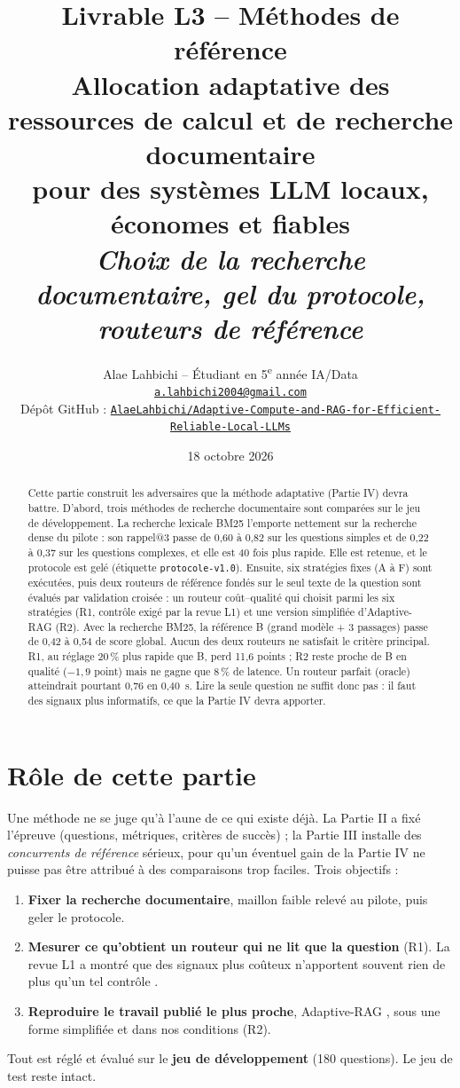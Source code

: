 \documentclass[11pt,a4paper]{article}
\title{\textbf{Livrable L3 -- Méthodes de référence}\\[4pt]
\large Allocation adaptative des ressources de calcul et de recherche documentaire\\ pour des systèmes LLM locaux, économes et fiables\\[2pt]
\normalsize\textit{Choix de la recherche documentaire, gel du protocole, routeurs de référence}}
\author{Alae Lahbichi -- Étudiant en 5\textsuperscript{e} année IA/Data\\[2pt]
\small\href{mailto:a.lahbichi2004@gmail.com}{\texttt{a.lahbichi2004@gmail.com}}\\
\small Dépôt GitHub : \href{https://github.com/AlaeLahbichi/Adaptive-Compute-and-RAG-for-Efficient-Reliable-Local-LLMs}{\footnotesize\texttt{AlaeLahbichi/Adaptive-Compute-and-RAG-for-Efficient-Reliable-Local-LLMs}}}
\date{18 octobre 2026}
\begin{document}
\maketitle

\begin{abstract}
\noindent Cette partie construit les adversaires que la méthode adaptative (Partie IV) devra battre.
D'abord, trois méthodes de recherche documentaire sont comparées sur le jeu de développement. La
recherche lexicale BM25 l'emporte nettement sur la recherche dense du pilote : son rappel@3 passe de
0,60 à 0,82 sur les questions simples et de 0,22 à 0,37 sur les questions complexes, et elle est 40 fois
plus rapide. Elle est retenue, et le protocole est gelé (étiquette \texttt{protocole-v1.0}). Ensuite,
six stratégies fixes (A à F) sont exécutées, puis deux routeurs de référence fondés sur le seul texte de
la question sont évalués par validation croisée : un routeur coût--qualité qui choisit parmi les six
stratégies (R1, contrôle exigé par la revue L1) et une version simplifiée d'Adaptive-RAG (R2).
Avec la recherche BM25, la référence B (grand modèle + 3 passages) passe de 0,42 à 0,54 de score
global. Aucun des deux routeurs ne satisfait le critère principal. R1, au réglage 20\,\% plus rapide que
B, perd 11,6 points ; R2 reste proche de B en qualité ($-1{,}9$ point) mais ne gagne que 8\,\% de
latence. Un routeur parfait (oracle) atteindrait pourtant 0,76 en 0,40~s. Lire la seule question ne
suffit donc pas : il faut des signaux plus informatifs, ce que la Partie IV devra apporter.
\end{abstract}

\clearpage
\tableofcontents
\clearpage

\section{Rôle de cette partie}

Une méthode ne se juge qu'à l'aune de ce qui existe déjà. La Partie II a fixé l'épreuve (questions,
métriques, critères de succès) ; la Partie III installe des \emph{concurrents de référence} sérieux,
pour qu'un éventuel gain de la Partie IV ne puisse pas être attribué à des comparaisons trop faciles.
Trois objectifs :
\begin{enumerate}
\item \textbf{Fixer la recherche documentaire}, maillon faible relevé au pilote, puis geler le protocole.
\item \textbf{Mesurer ce qu'obtient un routeur qui ne lit que la question} (R1). La revue L1 a montré que
des signaux plus coûteux n'apportent souvent rien de plus qu'un tel contrôle \citep{li2026beyond}.
\item \textbf{Reproduire le travail publié le plus proche}, Adaptive-RAG \citep{jeong2024adaptiverag},
sous une forme simplifiée et dans nos conditions (R2).
\end{enumerate}
Tout est réglé et évalué sur le \textbf{jeu de développement} (180 questions). Le jeu de test reste
intact.
\end{document}
